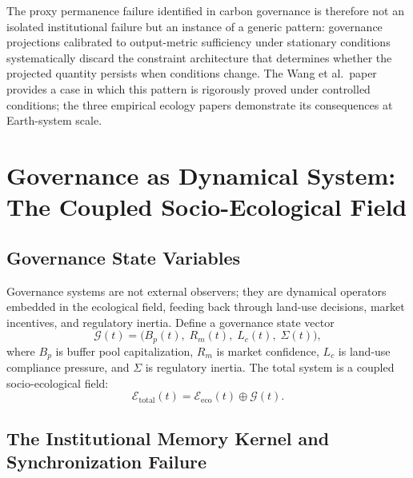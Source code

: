 \documentclass[12pt]{article}
\newcommand{\Ecal}{\mathcal{E}}
\newcommand{\Gcal}{\mathcal{G}}
\begin{document}
The proxy permanence failure identified in carbon governance is therefore not an
isolated institutional failure but an instance of a generic pattern: governance
projections calibrated to output-metric sufficiency under stationary conditions
systematically discard the constraint architecture that determines whether the projected
quantity persists when conditions change. The Wang et al.\ paper provides a case in
which this pattern is rigorously proved under controlled conditions; the three
empirical ecology papers demonstrate its consequences at Earth-system scale.

\section{Governance as Dynamical System: The Coupled Socio-Ecological Field}

\subsection{Governance State Variables}

Governance systems are not external observers; they are dynamical operators embedded in
the ecological field, feeding back through land-use decisions, market incentives, and
regulatory inertia. Define a governance state vector
\begin{equation}
\Gcal(t) = \bigl(B_p(t),\;R_m(t),\;L_c(t),\;\Sigma(t)\bigr),
\end{equation}
where $B_p$ is buffer pool capitalization, $R_m$ is market confidence, $L_c$ is land-use
compliance pressure, and $\Sigma$ is regulatory inertia. The total system is a coupled
socio-ecological field:
\begin{equation}
\Ecal_\text{total}(t) = \Ecal_\text{eco}(t)\oplus\Gcal(t).
\end{equation}

\subsection{The Institutional Memory Kernel and Synchronization Failure}
\end{document}
